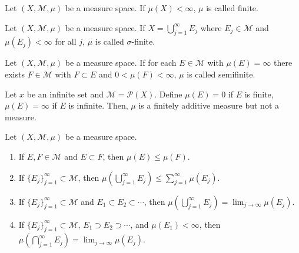 \begin{definition}
Let $(X, \mathcal{M}, \mu)$ be a measure space.
If $\mu(X) < \infty$, $\mu$ is called finite.
\end{definition}

\begin{definition}
Let $(X, \mathcal{M}, \mu)$ be a measure space.
If $X = \bigcup_{j=1}^{\infty} E_j$ where $E_j \in \mathcal{M}$ and $\mu(E_j) < \infty$ for all $j$, $\mu$ is called $\sigma$-finite.
\end{definition}

\begin{definition}
Let $(X, \mathcal{M}, \mu)$ be a measure space.
If for each $E \in \mathcal{M}$ with $\mu(E) = \infty$ there exists $F \in \mathcal{M}$ with $F \subset E$ and $0 < \mu(F) < \infty$, $\mu$ is called semifinite.
\end{definition}

\begin{example}
Let $x$ be an infinite set and $\mathcal{M} = \mathcal{P}(X)$.
Define $\mu(E) = 0$ if $E$ is finite, $\mu(E) = \infty$ if $E$ is infinite.
Then, $\mu$ is a finitely additive measure but not a measure.
\end{example}

\begin{theorem}
Let $(X, \mathcal{M}, \mu)$ be a measure space.
\begin{enumerate}
    \item If $E, F \in \mathcal{M}$ and $E \subset F$, then $\mu(E) \le \mu(F)$.
    \item If $\{ E_{j} \}_{j=1}^{\infty} \subset \mathcal{M}$, then $\mu(\bigcup_{j=1}^{\infty} E_j) \le \sum _{j=1}^{\infty} \mu(E_j)$.
    \item If $\{ E_{j} \}_{j=1}^{\infty} \subset \mathcal{M}$ and $E_1 \subset E_2 \subset \cdots$, then $\mu(\bigcup_{j=1}^{\infty} E_j) = \lim_{j\to \infty} \mu(E_j)$.
    \item If $\{ E_{j} \}_{j=1}^{\infty} \subset \mathcal{M}$, $E_1 \supset E_2 \supset \cdots$, and $\mu(E_1) < \infty$, then $\mu(\bigcap_{j=1}^{\infty} E_j) = \lim_{j\to \infty} \mu(E_j)$.
\end{enumerate}
\end{theorem}

